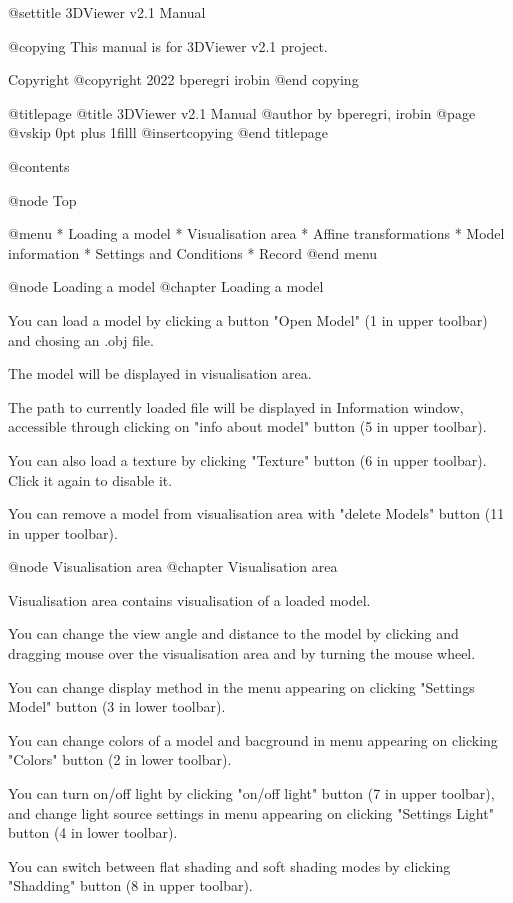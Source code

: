 
@settitle 3DViewer v2.1 Manual

@copying
This manual is for 3DViewer v2.1 project.

Copyright @copyright{} 2022 bperegri irobin
@end copying

@titlepage
@title 3DViewer v2.1 Manual
@author by bperegri, irobin
@page
@vskip 0pt plus 1filll
@insertcopying
@end titlepage

@contents

@node Top

@menu
* Loading a model
* Visualisation area
* Affine transformations
* Model information
* Settings and Conditions
* Record
@end menu

@node Loading a model
@chapter Loading a model

You can load a model by clicking a button "Open Model" (1 in upper toolbar) and chosing an .obj file.

The model will be displayed in visualisation area.

The path to currently loaded file will be displayed in Information window, accessible through clicking on "info about model" button (5 in upper toolbar).

You can also load a texture by clicking "Texture" button (6 in upper toolbar). Click it again to disable it.

You can remove a model from visualisation area with "delete Models" button (11 in upper toolbar).

@node Visualisation area
@chapter Visualisation area

Visualisation area contains visualisation of a loaded model.

You can change the view angle and distance to the model by clicking and dragging mouse over the visualisation area and by turning the mouse wheel.

You can change display method in the menu appearing on clicking "Settings Model" button (3 in lower toolbar).

You can change colors of a model and bacground in menu appearing on clicking "Colors" button (2 in lower toolbar).

You can turn on/off light by clicking "on/off light" button (7 in upper toolbar), and change light source settings in menu appearing on clicking "Settings Light" button (4 in lower toolbar).

You can switch between flat shading and soft shading modes by clicking "Shadding" button (8 in upper toolbar).

